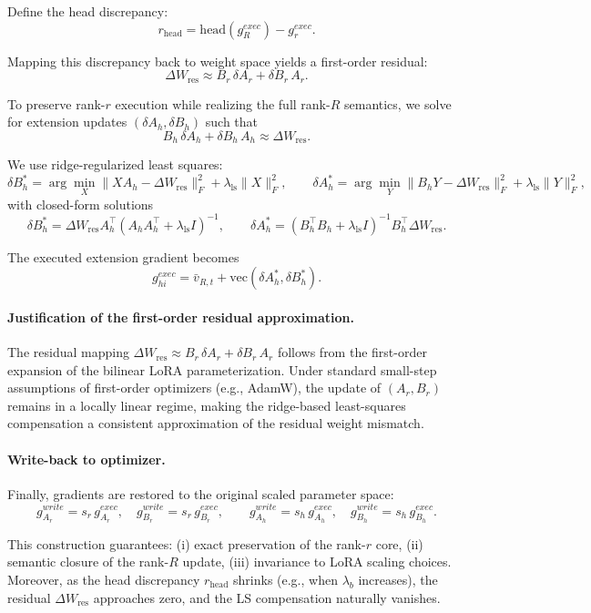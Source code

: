 \documentclass{article}
\begin{document}
Define the head discrepancy:
\[
r_{\mathrm{head}} =
\mathrm{head}(g_R^{exec}) - g_r^{exec}.
\]

Mapping this discrepancy back to weight space yields a first-order residual:
\[
\Delta W_{\mathrm{res}}
\approx
B_r\,\delta A_r + \delta B_r\,A_r.
\]

To preserve rank-$r$ execution while realizing the full rank-$R$ semantics,
we solve for extension updates $(\delta A_h,\delta B_h)$ such that
\[
B_h\,\delta A_h + \delta B_h\,A_h
\approx
\Delta W_{\mathrm{res}}.
\]

We use ridge-regularized least squares:
\[
\delta B_h^*
=
\arg\min_X
\|X A_h - \Delta W_{\mathrm{res}}\|_F^2
+
\lambda_{\mathrm{ls}}\|X\|_F^2,
\qquad
\delta A_h^*
=
\arg\min_Y
\|B_h Y - \Delta W_{\mathrm{res}}\|_F^2
+
\lambda_{\mathrm{ls}}\|Y\|_F^2,
\]
with closed-form solutions
\[
\delta B_h^*
=
\Delta W_{\mathrm{res}}
A_h^\top
(A_h A_h^\top + \lambda_{\mathrm{ls}} I)^{-1},
\qquad
\delta A_h^*
=
(B_h^\top B_h + \lambda_{\mathrm{ls}} I)^{-1}
B_h^\top
\Delta W_{\mathrm{res}}.
\]

The executed extension gradient becomes
\[
g_{hi}^{exec}
=
\bar v_{R,t}
+
\mathrm{vec}(\delta A_h^*, \delta B_h^*).
\]

\paragraph{Justification of the first-order residual approximation.}
The residual mapping
\(
\Delta W_{\mathrm{res}}
\approx
B_r\,\delta A_r + \delta B_r\,A_r
\)
follows from the first-order expansion of the bilinear LoRA parameterization.
Under standard small-step assumptions of first-order optimizers (e.g., AdamW),
the update of $(A_r,B_r)$ remains in a locally linear regime,
making the ridge-based least-squares compensation a consistent approximation
of the residual weight mismatch.

\paragraph{Write-back to optimizer.}
Finally, gradients are restored to the original scaled parameter space:
\[
g_{A_r}^{write}=s_r\,g_{A_r}^{exec},\quad
g_{B_r}^{write}=s_r\,g_{B_r}^{exec},
\qquad
g_{A_h}^{write}=s_h\,g_{A_h}^{exec},\quad
g_{B_h}^{write}=s_h\,g_{B_h}^{exec}.
\]

This construction guarantees:
(i) exact preservation of the rank-$r$ core,
(ii) semantic closure of the rank-$R$ update,
(iii) invariance to LoRA scaling choices.
Moreover, as the head discrepancy $r_{\mathrm{head}}$ shrinks (e.g., when $\lambda_b$ increases),
the residual $\Delta W_{\mathrm{res}}$ approaches zero, and the LS compensation
naturally vanishes.
\end{document}
